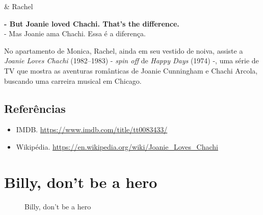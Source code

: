 \begin{tcolorbox}[enhanced,center upper,
    drop fuzzy shadow southeast, boxrule=0.3pt,
    lower separated=false,
    colframe=black!30!dialogoBorder,colback=white]
\begin{minipage}[c]{0.14\linewidth}
   & \centering \scriptsize{Rachel}
\end{minipage}
\hspace{.1mm}
\begin{minipage}[c]{0.8\linewidth}
  \textbf{- But Joanie loved Chachi. That's the difference.}\\
  - Mas Joanie ama Chachi. Essa é a diferença.
\end{minipage}
\end{tcolorbox}

No apartamento de Monica, Rachel, ainda em seu vestido de noiva, assiste
a \emph{Joanie Loves Chachi} (1982--1983) - \emph{spin off} de
\emph{Happy Days} (1974) -, uma série de TV que mostra as aventuras
românticas de Joanie Cunningham e Chachi Arcola, buscando uma carreira
musical em Chicago.

\hypertarget{referuxeancias-5}{%
\subsection{Referências}\label{referuxeancias-5}}

\begin{itemize}
\tightlist
\item
  \sloppy IMDB. \url{https://www.imdb.com/title/tt0083433/}
\item
  \sloppy Wikipédia. \url{https://en.wikipedia.org/wiki/Joanie_Loves_Chachi}
\end{itemize}

\hypertarget{billy-dont-be-a-hero}{%
\section{Billy, don't be a hero}\label{billy-dont-be-a-hero}}

\begin{figure}
  \centering
    \caption{Billy, don’t be a hero\label{fig:billy-don-t-be-a-hero}}
\end{figure}

